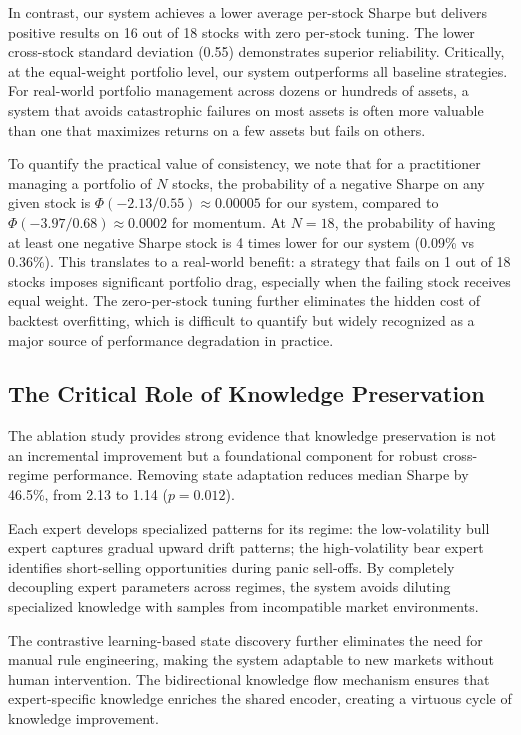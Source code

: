\documentclass[review]{elsarticle}
\begin{document}
In contrast, our system achieves a lower average per-stock Sharpe but delivers positive results on 16 out of 18 stocks with zero per-stock tuning. The lower cross-stock standard deviation (0.55) demonstrates superior reliability. Critically, at the equal-weight portfolio level, our system outperforms all baseline strategies. For real-world portfolio management across dozens or hundreds of assets, a system that avoids catastrophic failures on most assets is often more valuable than one that maximizes returns on a few assets but fails on others.

To quantify the practical value of consistency, we note that for a practitioner managing a portfolio of $N$ stocks, the probability of a negative Sharpe on any given stock is $\Phi(-2.13/0.55) \approx 0.00005$ for our system, compared to $\Phi(-3.97/0.68) \approx 0.0002$ for momentum. At $N=18$, the probability of having at least one negative Sharpe stock is 4 times lower for our system (0.09\% vs 0.36\%). This translates to a real-world benefit: a strategy that fails on 1 out of 18 stocks imposes significant portfolio drag, especially when the failing stock receives equal weight. The zero-per-stock tuning further eliminates the hidden cost of backtest overfitting, which is difficult to quantify but widely recognized as a major source of performance degradation in practice.

\subsection{The Critical Role of Knowledge Preservation}

The ablation study provides strong evidence that knowledge preservation is not an incremental improvement but a foundational component for robust cross-regime performance. Removing state adaptation reduces median Sharpe by 46.5\%, from 2.13 to 1.14 ($p=0.012$).

Each expert develops specialized patterns for its regime: the low-volatility bull expert captures gradual upward drift patterns; the high-volatility bear expert identifies short-selling opportunities during panic sell-offs. By completely decoupling expert parameters across regimes, the system avoids diluting specialized knowledge with samples from incompatible market environments.

The contrastive learning-based state discovery further eliminates the need for manual rule engineering, making the system adaptable to new markets without human intervention. The bidirectional knowledge flow mechanism ensures that expert-specific knowledge enriches the shared encoder, creating a virtuous cycle of knowledge improvement.
\end{document}
